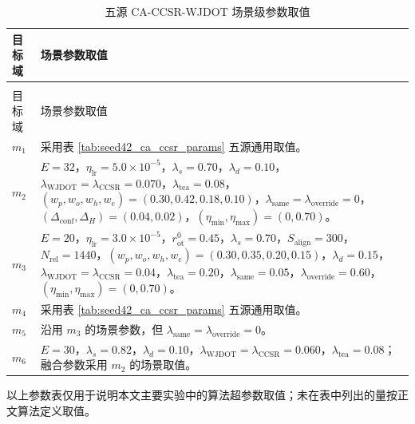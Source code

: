 \documentclass{seuthesis-2022}
\begin{document}
{
\setlength{\tabcolsep}{3.5pt}
\renewcommand{\arraystretch}{1.16}
\begin{longtable}{@{}>{\raggedright\arraybackslash}p{}>{\raggedright\arraybackslash}p{}@{}}
    \caption{五源 CA-CCSR-WJDOT 场景级参数取值}
    \label{tab:seed42_ca_scene_overrides}\\
    \toprule
    目标域 & 场景参数取值 \\
    \midrule
    \endfirsthead
    \multicolumn{2}{r}{续表~\thetable}\\
    \toprule
    目标域 & 场景参数取值 \\
    \midrule
    \endhead
    \bottomrule
    \endfoot
    \bottomrule
    \endlastfoot

    $m_1$ & 采用表 \ref{tab:seed42_ca_ccsr_params} 五源通用取值。 \\
    $m_2$ & $E=32$，$\eta_{\mathrm{lr}}=5.0\times10^{-5}$，$\lambda_s=0.70$，$\lambda_d=0.10$，$\lambda_{\mathrm{WJDOT}}=\lambda_{\mathrm{CCSR}}=0.070$，$\lambda_{\mathrm{tea}}=0.08$，$(w_p,w_o,w_h,w_e)=(0.30,0.42,0.18,0.10)$，$\lambda_{\mathrm{same}}=\lambda_{\mathrm{override}}=0$，$(\Delta_{\mathrm{conf}},\Delta_H)=(0.04,0.02)$，$(\eta_{\min},\eta_{\max})=(0,0.70)$。 \\
    $m_3$ & $E=20$，$\eta_{\mathrm{lr}}=3.0\times10^{-5}$，$r_{\mathrm{ot}}^0=0.45$，$\lambda_s=0.70$，$S_{\mathrm{align}}=300$，$N_{\mathrm{rel}}=1440$，$(w_p,w_o,w_h,w_e)=(0.30,0.35,0.20,0.15)$，$\lambda_d=0.15$，$\lambda_{\mathrm{WJDOT}}=\lambda_{\mathrm{CCSR}}=0.04$，$\lambda_{\mathrm{tea}}=0.20$，$\lambda_{\mathrm{same}}=0.05$，$\lambda_{\mathrm{override}}=0.60$，$(\eta_{\min},\eta_{\max})=(0,0.70)$。 \\
    $m_4$ & 采用表 \ref{tab:seed42_ca_ccsr_params} 五源通用取值。 \\
    $m_5$ & 沿用 $m_3$ 的场景参数，但 $\lambda_{\mathrm{same}}=\lambda_{\mathrm{override}}=0$。 \\
    $m_6$ & $E=30$，$\lambda_s=0.82$，$\lambda_d=0.10$，$\lambda_{\mathrm{WJDOT}}=\lambda_{\mathrm{CCSR}}=0.060$，$\lambda_{\mathrm{tea}}=0.08$；融合参数采用 $m_2$ 的场景取值。 \\
\end{longtable}
}

以上参数表仅用于说明本文主要实验中的算法超参数取值；未在表中列出的量按正文算法定义取值。
\end{document}
